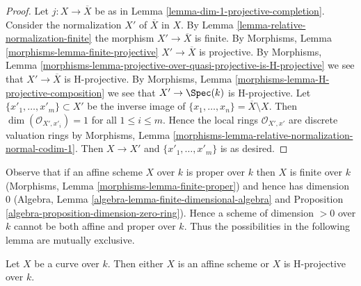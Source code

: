\begin{proof}
Let $j : X \to \overline{X}$ be as in
Lemma \ref{lemma-dim-1-projective-completion}.
Consider the normalization $X'$ of $\overline{X}$ in
$X$. By Lemma \ref{lemma-relative-normalization-finite}
the morphism $X' \to \overline{X}$ is finite.
By Morphisms, Lemma \ref{morphisms-lemma-finite-projective}
$X' \to \overline{X}$ is projective. By Morphisms, Lemma
\ref{morphisms-lemma-projective-over-quasi-projective-is-H-projective}
we see that $X' \to \overline{X}$ is H-projective.
By Morphisms, Lemma \ref{morphisms-lemma-H-projective-composition}
we see that $X' \to \Spec(k)$ is H-projective.
Let $\{x'_1, \ldots, x'_m\} \subset X'$ be the inverse
image of $\{x_1, \ldots, x_n\} = \overline{X} \setminus X$.
Then $\dim(\mathcal{O}_{X', x'_i}) = 1$ for all $1 \leq i \leq m$.
Hence the local rings $\mathcal{O}_{X', x'}$
are discrete valuation rings by
Morphisms, Lemma
\ref{morphisms-lemma-relative-normalization-normal-codim-1}.
Then $X \to X'$ and $\{x'_1, \ldots, x'_m\}$ is as desired.
\end{proof}

\noindent
Observe that if an affine scheme $X$ over $k$ is proper over $k$
then $X$ is finite over $k$ (Morphisms, Lemma
\ref{morphisms-lemma-finite-proper}) and hence has
dimension $0$
(Algebra, Lemma \ref{algebra-lemma-finite-dimensional-algebra} and
Proposition \ref{algebra-proposition-dimension-zero-ring}).
Hence a scheme of dimension $> 0$ over $k$ cannot be both affine and
proper over $k$. Thus the possibilities in the following lemma are
mutually exclusive.

\begin{lemma}
\label{lemma-curve-affine-projective}
Let $X$ be a curve over $k$. Then either $X$ is an affine scheme or $X$
is H-projective over $k$.
\end{lemma}

